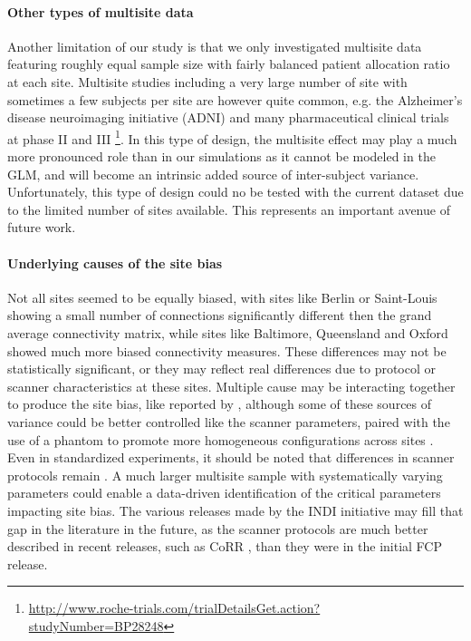\documentclass[authoryear]{elsarticle}
\begin{document}
\paragraph{Other types of multisite data} Another limitation of our study is that we only investigated multisite data featuring roughly equal sample size with fairly balanced patient allocation ratio at each site. Multisite studies including a very large number of site with sometimes a few subjects per site are however quite common, e.g. the Alzheimer’s disease neuroimaging initiative (ADNI) \citep{Mueller2005} and many pharmaceutical clinical trials at phase II and III \footnote{\url{http://www.roche-trials.com/trialDetailsGet.action?studyNumber=BP28248}}. In this type of design, the multisite effect may play a much more pronounced role than in our simulations as it cannot be modeled in the GLM, and will become an intrinsic added source of inter-subject variance. Unfortunately, this type of design could no be tested with the current dataset due to the limited number of sites available. This represents an important avenue of future work. 

\paragraph{Underlying causes of the site bias}
Not all sites seemed to be equally biased, with sites like Berlin or Saint-Louis showing a small number of connections significantly different then the grand average connectivity matrix, while sites like Baltimore, Queensland and Oxford showed much more biased connectivity measures. These differences may not be statistically significant, or they may reflect real differences due to protocol or scanner characteristics at these sites. Multiple cause may be interacting together to produce the site bias, like reported by \cite{Yan2013a}, although some of these sources of variance could be better controlled like the scanner parameters, paired with the use of a phantom to promote more homogeneous configurations across sites \cite{Friedman2006,Friedman2006a,Glover2012}. Even in standardized experiments, it should be noted that differences in scanner protocols remain \cite{Brown2011}. A much larger multisite sample with systematically varying parameters could enable a data-driven identification of the critical parameters impacting site bias. The various releases made by the INDI initiative may fill that gap in the literature in the future, as the scanner protocols are much better described in recent releases, such as CoRR \citep{Zuo2014-ec}, than they were in the initial FCP release.
\end{document}
